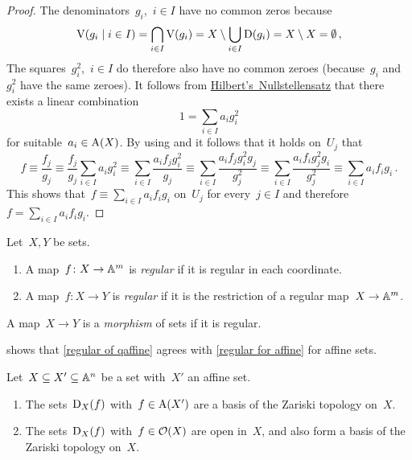 \begin{proof}
  The denominators~$g_i$,~$i \in I$ have no common zeros because
  \[
              \vset(g_i \suchthat i \in I)
    =         \bigcap_{i \in I} \vset(g_i)
    =         X \setminus \bigcup_{i \in I} \Dopen(g_i)
    =         X \setminus X
    =         \emptyset \,,
  \]
  The squares~$g_i^2$,~$i \in I$ do therefore also have no common zeroes (because~$g_i$ and~$g_i^2$ have the same zeroes).
  It follows from \hyperref[nullstellensatz 2]{Hilbert’s~Nullstellensatz} that there exists a linear combination
  \begin{equation}
  \label{unit as linear combination}
      1
    = \sum_{i \in I} a_i g_i^2
  \end{equation}
  for suitable~$a_i \in \operatorname{A}(X)$.
  By using  and  it follows that it holds on~$U_j$ that
  \[
            f
    \equiv  \frac{f_j}{g_j}
    \equiv  \frac{f_j}{g_j} \sum_{i \in I} a_i g_i^2
    \equiv  \sum_{i \in I} \frac{a_i f_j g_i^2}{g_j}
    \equiv  \sum_{i \in I} \frac{a_i f_j g_i^2 g_j}{g_j^2}
    \equiv  \sum_{i \in I} \frac{a_i f_i g_j^2 g_i}{g_j^2}
    \equiv  \sum_{i \in I} a_i f_i g_i \,.
  \]
  This shows that~$f \equiv \sum_{i \in I} a_i f_i g_i$ on~$U_j$ for every~$j \in I$ and therefore~$f = \sum_{i \in I} a_i f_i g_i$.
\end{proof}




\begin{definition}
  \label{regular of qaffine}
  Let~$X,Y$ be {\qaffine} sets.
  \begin{enumerate}[resume]
    \item
      A map~$f \colon X \to \mathbb{A}^m$ is \emph{regular} if it is regular in each coordinate.
    \item
      A map~$f \colon X \to Y$ is \emph{regular} if it is the restriction of a regular map~$X \to \mathbb{A}^m$.
  \end{enumerate}
  A map~$X \to Y$ is a \emph{morphism} of {\qaffine} sets if it is regular.
\end{definition}


\begin{remark}
   shows that \cref{regular of qaffine} agrees with \cref{regular for affine} for affine sets.
\end{remark}


\begin{lemma}
  Let~$X \subseteq X' \subseteq \mathbb{A}^n$ be a {\qaffine} set with~$X'$ an affine set.
  \begin{enumerate}
    \item
      The sets~$\operatorname{D}_X(f)$ with~$f \in \operatorname{A}(X')$ are a basis of the Zariski topology on~$X$.
    \item
      The sets~$\operatorname{D}_X(f)$ with~$f \in \mathcal{O}(X)$ are open in~$X$, and also form a basis of the Zariski topology on~$X$.
  \end{enumerate}
\end{lemma}


